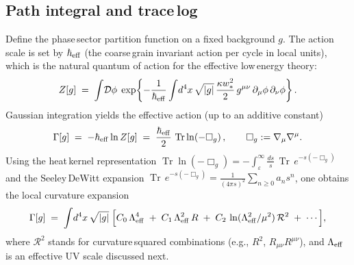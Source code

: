 \documentclass[11pt]{article}
\begin{document}
\subsection*{Path integral and trace\,log}
Define the phase\,sector partition function on a fixed background $g$. The action scale is set by $\hbar_{\rm eff}$ (the coarse\,grain invariant action per cycle in local units), which is the natural quantum of action for the effective low\,energy theory:
\begin{equation}
  Z[g] \;=\; \int \!\mathcal D\phi\; \exp\!\left\{-\frac{1}{\hbar_{\rm eff}} \int \! d^4x\, \sqrt{|g|}\, \frac{\kappa w_*^2}{2}\, g^{\mu\nu}\, \partial_\mu\phi\,\partial_\nu\phi \right\}.
\end{equation}
Gaussian integration yields the effective action (up to an additive constant)
\begin{equation}
  \Gamma[g] \;=\; -\hbar_{\rm eff} \ln Z[g] \;=\; \frac{\hbar_{\rm eff}}{2}\, \operatorname{Tr} \ln (-\Box_g)\,,\qquad \Box_g:=\nabla_\mu\nabla^\mu.
\end{equation}
Using the heat\,kernel representation $\operatorname{Tr}\ln(-\Box_g)=-\int_{\varepsilon}^{\infty}\!\frac{ds}{s}\, \operatorname{Tr}\, e^{-s(-\Box_g)}$ and the Seeley\,DeWitt expansion $\operatorname{Tr}\, e^{-s(-\Box_g)}=\frac{1}{(4\pi s)^2}\sum_{n\ge0} a_n s^n$, one obtains the local curvature expansion
\begin{equation}
  \Gamma[g] \;=\; \int \! d^4x\,\sqrt{|g|}\; \Big[ C_0\, \Lambda_{\rm eff}^4 \; +\; C_1\, \Lambda_{\rm eff}^2\, R \; +\; C_2\, \ln(\Lambda_{\rm eff}^2/\mu^2)\, \mathcal R^2 \; +\; \cdots \Big],
\end{equation}
where $\mathcal R^2$ stands for curvature\,squared combinations (e.g., $R^2$, $R_{\mu\nu}R^{\mu\nu}$), and $\Lambda_{\rm eff}$ is an effective UV scale discussed next.
\end{document}
